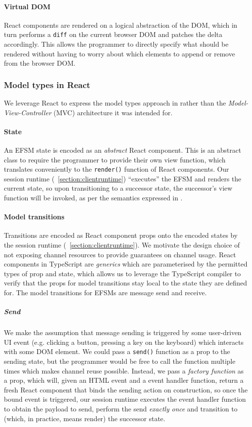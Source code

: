 \documentclass[submission,copyright,creativecommons]{eptcs}
\newcommand{\sectionref}[1]{\textsection~\ref{#1}}
\begin{document}
\paragraph{Virtual DOM} React components are rendered on a logical abstraction of the DOM, which in turn performs a \texttt{diff} on the current browser DOM and patches the delta accordingly. This allows the programmer to directly specify what should be rendered without having to worry about which elements to append or remove from the browser DOM.

\subsubsection{Model types in React}
We leverage React to express the model types approach in \cite{MVU2019} rather than the \textit{Model-View-Controller} (MVC) architecture it was intended for. 

\paragraph{State} An EFSM state is encoded as an \textit{abstract} React component. This is an abstract class to require the programmer to provide their own view function, which translates conveniently to the \texttt{render()} function of React components. Our session runtime (\sectionref{section:clientruntime}) ``executes'' the EFSM and renders the current state, so upon transitioning to a successor state, the successor's view function will be invoked, as per the semantics expressed in \cite{MVU2019}.

\paragraph{Model transitions} Transitions are encoded as React component props onto the encoded states by the session runtime (\sectionref{section:clientruntime}). We motivate the design choice of not exposing channel resources to provide guarantees on channel usage. React components in TypeScript are \textit{generics} \cite{TypeScriptSpec} which are parameterised by the permitted types of prop and state, which allows us to leverage the TypeScript compiler to verify that the props for model transitions stay local to the state they are defined for. The model transitions for EFSMs are message send and receive.

\subparagraph{Send} We make the assumption that message sending is triggered by some user-driven UI event (e.g. clicking a button, pressing a key on the keyboard) which interacts with some DOM element. We could pass a \texttt{send()} function as a prop to the sending state, but the programmer would be free to call the function multiple times which makes channel reuse possible. Instead, we pass a \textit{factory function} as a prop, which will, given an HTML event and a event handler function, return a fresh React component that binds the sending action on construction, so once the bound event is triggered, our session runtime executes the event handler function to obtain the payload to send, perform the send \textit{exactly once} and transition to (which, in practice, means render) the successor state. 
\end{document}
